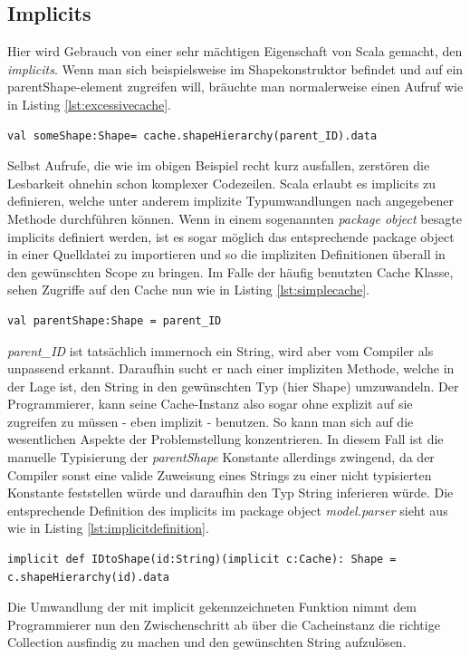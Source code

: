 \subsection{Implicits}\label{sectionimplicit}
Hier wird Gebrauch von einer sehr mächtigen Eigenschaft von Scala gemacht, den \textit{implicits}. Wenn man sich beispielsweise im Shapekonstruktor befindet und auf ein parentShape-element zugreifen will, bräuchte man normalerweise einen Aufruf wie in Listing \ref{lst:excessivecache}.
\begin{lstlisting}[style=scala, caption = {Ausführlicher Zugriff auf ein Cache Element}, label = {lst:excessivecache}]
val someShape:Shape= cache.shapeHierarchy(parent_ID).data
\end{lstlisting}Selbst Aufrufe, die wie im obigen Beispiel recht kurz ausfallen, zerstören die Lesbarkeit ohnehin schon komplexer Codezeilen. Scala erlaubt es implicits zu definieren, welche unter anderem implizite Typumwandlungen nach angegebener Methode durchführen können. Wenn in einem sogenannten \textit{package object} besagte implicits definiert werden, ist es sogar möglich das entsprechende package object in einer Quelldatei zu importieren und so die impliziten Definitionen überall in den gewünschten Scope zu bringen. Im Falle der häufig benutzten Cache Klasse, sehen Zugriffe auf den Cache nun wie in Listing \ref{lst:simplecache}.
\begin{lstlisting}[style=scala, caption = {Vereinfachter Zugriff auf ein Cache Element}, label = {lst:simplecache}]
val parentShape:Shape = parent_ID
\end{lstlisting}
\textit{parent\_ID} ist tatsächlich immernoch ein String, wird aber vom Compiler als unpassend erkannt. Daraufhin sucht er nach einer impliziten Methode, welche in der Lage ist, den String in den gewünschten Typ (hier Shape) umzuwandeln. Der Programmierer, kann seine Cache-Instanz also sogar ohne explizit auf sie zugreifen zu müssen - eben implizit - benutzen. So kann man sich auf die wesentlichen Aspekte der Problemstellung konzentrieren. In diesem Fall ist die manuelle Typisierung der \textit{parentShape} Konstante allerdings zwingend, da der Compiler sonst eine valide Zuweisung eines Strings zu einer nicht typisierten Konstante feststellen würde und daraufhin den Typ String inferieren würde. Die entsprechende Definition des implicits im package object \textit{model.parser} sieht aus wie in Listing \ref{lst:implicitdefinition}.
\begin{lstlisting}[style=scala, caption = {Auszug aus Code Definition einer Impliziten Typumwandlung}, label = {lst:implicitdefinition}]
implicit def IDtoShape(id:String)(implicit c:Cache): Shape =
c.shapeHierarchy(id).data
\end{lstlisting}Die Umwandlung der mit implicit gekennzeichneten Funktion nimmt dem Programmierer nun den Zwischenschritt ab über die Cacheinstanz die richtige Collection ausfindig zu machen und den gewünschten String aufzulösen.
